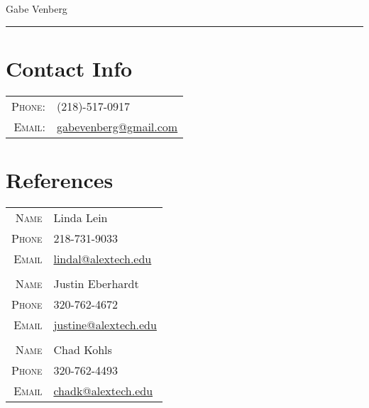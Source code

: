 \documentclass[letterpaper,12pt]{article}
\begin{document}
\pagestyle{empty}%

	\par{\centering
		{\huge Gabe Venberg
	}\bigskip\par}
\hrule

\section*{Contact Info}
	\begin{tabular}{rl}
	\textsc{Phone:} & (218)-517-0917\\
	\textsc{Email:} & \href{mailto:gabevenberg@gmail.com}{gabevenberg@gmail.com}\\
	\end{tabular}

\section*{References}
	\begin{tabular}{r|p{11cm}}
	\textsc{Name} & Linda Lein\\
	\textsc{Phone} & 218-731-9033\\
	\textsc{Email} & \href{mailto:lindal@alextech.edu}{lindal@alextech.edu}\\
	\multicolumn{2}{c}{}\\
	\textsc{Name} & Justin Eberhardt\\
	\textsc{Phone} & 320-762-4672\\
	\textsc{Email} & \href{mailto:justine@alextech.edu}{justine@alextech.edu}\\
	\multicolumn{2}{c}{}\\
	\textsc{Name} & Chad Kohls\\
	\textsc{Phone} & 320-762-4493\\
	\textsc{Email} & \href{mailto:chadk@alextech.edu}{chadk@alextech.edu}\\
	\end{tabular}
\end{document}
